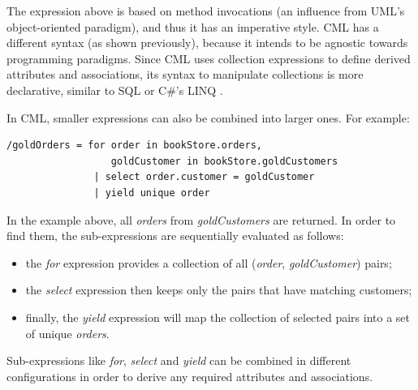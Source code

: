 The expression above is based on method invocations
(an influence from UML's object-oriented paradigm),
and thus it has an imperative style. CML has a different syntax (as shown previously),
because it intends to be agnostic towards programming paradigms.
Since CML uses collection expressions to define derived attributes and associations,
its syntax to manipulate collections is more declarative,
similar to SQL \cite{sql} or C\#'s LINQ \cite{torgersen}.
 
In CML, smaller expressions can also be combined into larger ones. For example:
 
\verbatimfont{\small}
\begin{verbatim}
/goldOrders = for order in bookStore.orders,
                  goldCustomer in bookStore.goldCustomers
               | select order.customer = goldCustomer
               | yield unique order
 \end{verbatim}

In the example above, all \emph{orders} from \emph{goldCustomers} are returned.
In order to find them, the sub-expressions are sequentially evaluated as follows:

\begin{itemize}
\item the \emph{for} expression provides a collection of all (\emph{order}, \emph{goldCustomer}) pairs;
\item the \emph{select} expression then keeps only the pairs that have matching customers;
\item finally, the \emph{yield} expression will map the collection of selected pairs into a set of unique \emph{orders}.
\end{itemize}

Sub-expressions like \emph{for}, \emph{select} and \emph{yield} can be combined in different configurations
in order to derive any required attributes and associations.